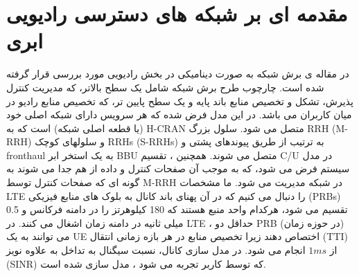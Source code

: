 \section{مقدمه ای بر شبکه های دسترسی رادیویی ابری}
در مقاله ی \cite{lee2018dynamic}
برش شبکه به صورت دینامیکی در بخش رادیویی مورد بررسی قرار گرفته شده است.
چارچوب طرح برش شبکه شامل یک سطح بالاتر، که مدیریت کنترل پذیرش، تشکل و تخصیص منابع باند پایه و یک سطح پایین تر، که تخصیص منابع رادیو در میان کاربران می باشد.
در این مدل فرض شده که هر سرویس دارای شبکه اصلی خود (یا قطعه اصلی شبکه) است که به H-CRAN متصل می شود.
سلول بزرگ RRH (M-RRH) و سلولهای کوچک RRHs (S-RRHs) به ترتیب از طریق پیوندهای پشتی و fronthaul به یک استخر ابر
BBU  متصل می شوند.
همچنین ، تقسیم C/U در مدل سیستم فرض می شود، که به موجب آن صفحات کنترل و داده از هم جدا می شوند به گونه ای که صفحات کنترل توسط M-RRH در شبکه مدیریت می شود.
ما مشخصات LTE را دنبال می کنیم که در آن پهنای باند کانال به بلوک های منابع فیزیکی (PRBs) تقسیم می شود، هرکدام واحد منبع هستند که 180 کیلوهرتز را در دامنه فرکانس و 0.5 میلی ثانیه در دامنه زمان اشغال می کنند.
در LTE ، حداقل دو PRB (در حوزه زمان) می توانند به یک UE اختصاص دهند زیرا تخصیص منابع در هر بازه زمانی انتقال (TTI) از
$1ms$
 انجام می شود.
   در مدل سازی کانال، نسبت سیگنال به تداخل به علاوه نویز (SINR) که توسط کاربر 
     تجربه می شود ، مدل سازی شده است.
